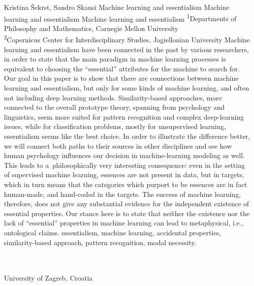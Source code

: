 \begin{artengenv2auth}{Kristina Šekrst, Sandro Skansi}
	{Machine learning and essentialism}
	{Machine learning and essentialism}
	{Machine learning and essentialism}
	{\textsuperscript{1}Departments of Philosophy and Mathematics, Carnegie Mellon University\\
		\textsuperscript{2}Copernicus Center for Interdisciplinary Studies, Jagiellonian University}
	{\label{sekrst_start}Machine learning and essentialism have been connected in the past by various researchers, in order to state that the main paradigm in machine learning processes is equivalent to choosing the ``essential'' attributes for the machine to search for. Our goal in this paper is to show that there are connections between machine learning and essentialism, but only for some kinds of machine learning, and often not including deep learning methods. Similarity-based approaches, more connected to the overall prototype theory, spanning from psychology and linguistics, seem more suited for pattern recognition and complex deep-learning issues, while for classification problems, mostly for unsupervised learning, essentialism seems like the best choice. In order to illustrate the difference better, we will connect both paths to their sources in other disciplines and see how human psychology influences our decision in machine-learning modeling as well. This leads to a~philosophically very interesting consequence: even in the setting of supervised machine learning, essences are not present in data, but in targets, which in turn means that the categories which purport to be essences are in fact human-made, and hand-coded in the targets. The success of machine learning, therefore, does not give any substantial evidence for the independent existence of essential properties. Our stance here is to state that neither the existence nor the lack of ``essential'' properties in machine learning can lead to metaphysical, i.e., ontological claims.}
	{essentialism, machine learning, accidental properties, similarity-based approach, pattern recognition, modal necessity.}
	{%
				{\flushright{}\\\\\subsubsectit\small{University of Zagreb, Croatia}\par}%
	}



\end{artengenv2auth}
